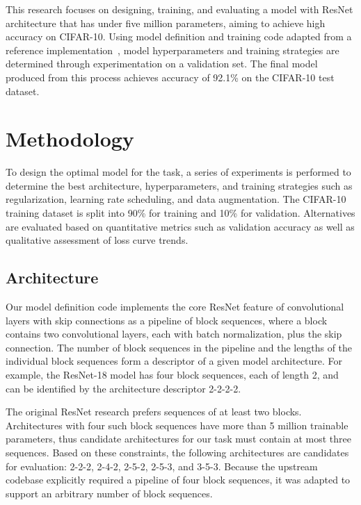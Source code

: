 \documentclass[letterpaper]{article} %
\begin{document}
This research focuses on designing, training, and evaluating a model with ResNet architecture that has under five
million parameters, aiming to achieve high accuracy on CIFAR-10.
Using model definition and training code adapted from a reference implementation~\cite{kl:2021}, model
hyperparameters and training strategies are determined through experimentation on a validation set.
The final model produced from this process achieves accuracy of 92.1\% on the CIFAR-10 test dataset.

\section{Methodology}

To design the optimal model for the task, a series of experiments is performed to determine the best architecture,
hyperparameters, and training strategies such as regularization, learning rate scheduling, and data augmentation.
The CIFAR-10 training dataset is split into 90\% for training and 10\% for validation.
Alternatives are evaluated based on quantitative metrics such as validation accuracy as well as qualitative assessment
of loss curve trends.

\subsection{Architecture}

Our model definition code implements the core ResNet feature of convolutional layers with skip connections as a
pipeline of block sequences, where a block contains two convolutional layers, each with batch normalization, plus the
skip connection.
The number of block sequences in the pipeline and the lengths of the individual block sequences form a descriptor of a
given model architecture.
For example, the ResNet-18 model has four block sequences, each of length 2, and can be identified by the architecture
descriptor 2-2-2-2.

The original ResNet research prefers sequences of at least two blocks.
Architectures with four such block sequences have more than 5 million trainable parameters, thus candidate
architectures for our task must contain at most three sequences.
Based on these constraints, the following architectures are candidates for evaluation: 2-2-2, 2-4-2, 2-5-2, 2-5-3,
and 3-5-3.
Because the upstream codebase explicitly required a pipeline of four block sequences, it was adapted to support an
arbitrary number of block sequences.
\end{document}
